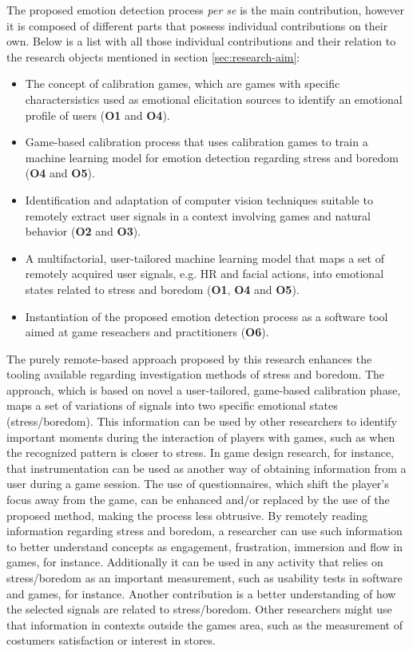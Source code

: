 The proposed emotion detection process \textit{per se} is the main contribution, however it is composed of different parts that possess individual contributions on their own. Below is a list with all those individual contributions and their relation to the research objects mentioned in section \ref{sec:research-aim}:

\begin{itemize}
  \item The concept of calibration games, which are games with specific charactersistics used as emotional elicitation sources to identify an emotional profile of users (\textbf{O1} and \textbf{O4}).
  \item Game-based calibration process that uses calibration games to train a machine learning model for emotion detection regarding stress and boredom (\textbf{O4} and \textbf{O5}).
  \item Identification and adaptation of computer vision techniques suitable to remotely extract user signals in a context involving games and natural behavior (\textbf{O2} and \textbf{O3}).
  \item A multifactorial, user-tailored machine learning model that maps a set of remotely acquired user signals, e.g. HR and facial actions, into emotional states related to stress and boredom (\textbf{O1}, \textbf{O4} and \textbf{O5}).
  \item Instantiation of the proposed emotion detection process as a software tool aimed at game reseachers and practitioners (\textbf{O6}).
\end{itemize}

The purely remote-based approach proposed by this research enhances the tooling available regarding investigation methods of stress and boredom. The approach, which is based on novel a user-tailored, game-based calibration phase, maps a set of variations of signals into two specific emotional states (stress/boredom). This information can be used by other researchers to identify important moments during the interaction of players with games, such as when the recognized pattern is closer to stress. In game design research, for instance, that instrumentation can be used as another way of obtaining information from a user during a game session. The use of questionnaires, which shift the player's focus away from the game, can be enhanced and/or replaced by the use of the proposed method, making the process less obtrusive. By remotely reading information regarding stress and boredom, a researcher can use such information to better understand concepts as engagement, frustration, immersion and flow in games, for instance. Additionally it can be used in any activity that relies on stress/boredom as an important measurement, such as usability tests in software and games, for instance. Another contribution is a better understanding of how the selected signals are related to stress/boredom. Other researchers might use that information in contexts outside the games area, such as the measurement of costumers satisfaction or interest in stores.

